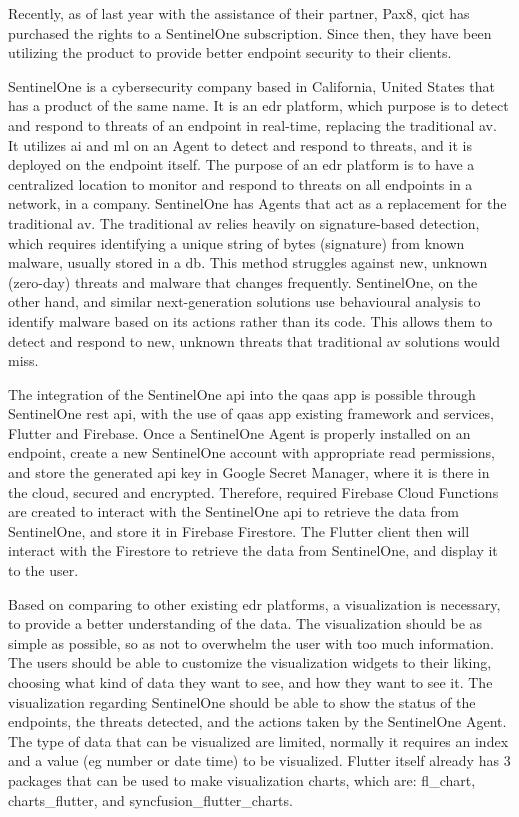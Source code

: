 Recently, as of last year with the assistance of their partner, Pax8, \acrshort{qict} has purchased the rights
to a SentinelOne subscription. Since then, they have been utilizing the product to provide better endpoint security to their clients.

SentinelOne is a cybersecurity company based in California, United States that has a product of the same name. It is an
\acrshort{edr} platform, which purpose is to detect and respond to threats of an endpoint in real-time, replacing the
traditional \acrshort{av}. It utilizes \acrshort{ai} and \acrshort{ml} on an Agent to detect and respond to threats, and it is
deployed on the endpoint itself. The purpose of an \acrshort{edr} platform is to have a centralized location to monitor and
respond to threats on all endpoints in a network, in a company. SentinelOne has Agents that act as a replacement for the
traditional \acrshort{av}. The traditional \acrshort{av} relies heavily on signature-based detection, which requires
identifying a unique string of bytes (signature) from known malware, usually stored in a \acrshort{db}. This method
struggles against new, unknown (zero-day) threats and malware that changes frequently. SentinelOne, on the other hand,
and similar next-generation solutions use behavioural analysis to identify malware based on its actions rather than its code.
This allows them to detect and respond to new, unknown threats that traditional \acrshort{av} solutions would miss.

The integration of the SentinelOne \acrshort{api} into the \acrshort{qaas} app is possible through SentinelOne \acrshort{rest} \acrshort{api},
with the use of \acrshort{qaas} app existing framework and services, Flutter and Firebase. Once a SentinelOne Agent is properly installed on an
endpoint, create a new SentinelOne account with appropriate read permissions, and store the generated \acrshort{api} key in Google Secret Manager,
where it is there in the cloud, secured and encrypted. Therefore, required Firebase Cloud Functions are created to interact with the SentinelOne
\acrshort{api} to retrieve the data from SentinelOne, and store it in Firebase Firestore. The Flutter client then will interact with the
Firestore to retrieve the data from SentinelOne, and display it to the user.

Based on comparing to other existing \acrshort{edr} platforms, a visualization is necessary, to provide a better understanding of the data.
The visualization should be as simple as possible, so as not to overwhelm the user with too much information. The users should be able to
customize the visualization widgets to their liking, choosing what kind of data they want to see, and how they want to see it. The visualization
regarding SentinelOne should be able to show the status of the endpoints, the threats detected, and the actions taken by the SentinelOne Agent.
The type of data that can be visualized are limited, normally it requires an index and a value (\acrshort{eg} number or date time) to be visualized.
Flutter itself already has 3 packages that can be used to make visualization charts, which are: fl\_chart, charts\_flutter, and syncfusion\_flutter\_charts.


